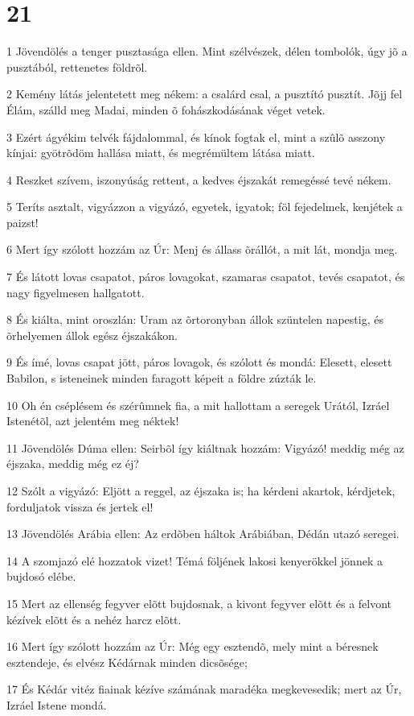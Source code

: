 \chapter{21}

\par 1 Jövendölés a tenger pusztasága ellen. Mint szélvészek, délen tombolók, úgy jõ a pusztából, rettenetes földrõl.
\par 2 Kemény látás jelentetett meg nékem: a csalárd csal, a pusztító pusztít. Jõjj fel Élám, szálld meg Madai, minden õ fohászkodásának véget vetek.
\par 3 Ezért ágyékim telvék fájdalommal, és kínok fogtak el, mint a szûlõ asszony kínjai: gyötrõdöm hallása miatt, és megrémültem látása miatt.
\par 4 Reszket szívem, iszonyúság rettent, a kedves éjszakát remegéssé tevé nékem.
\par 5 Teríts asztalt, vigyázzon a vigyázó, egyetek, igyatok; föl fejedelmek, kenjétek a paizst!
\par 6 Mert így szólott hozzám az Úr: Menj és állass õrállót, a mit lát, mondja meg.
\par 7 És látott lovas csapatot, páros lovagokat, szamaras csapatot, tevés csapatot, és nagy figyelmesen hallgatott.
\par 8 És kiálta, mint oroszlán: Uram az õrtoronyban állok szüntelen napestig, és õrhelyemen állok egész éjszakákon.
\par 9 És ímé, lovas csapat jött, páros lovagok, és szólott és mondá: Elesett, elesett Babilon, s isteneinek minden faragott képeit a földre zúzták le.
\par 10 Oh én cséplésem és szérûmnek fia, a mit hallottam a seregek Urától, Izráel Istenétõl, azt jelentém meg néktek!
\par 11 Jövendölés Dúma ellen: Seirbõl így kiáltnak hozzám: Vigyázó! meddig még az éjszaka, meddig még ez éj?
\par 12 Szólt a vigyázó: Eljött a reggel, az éjszaka is; ha kérdeni akartok, kérdjetek, forduljatok vissza és jertek el!
\par 13 Jövendölés Arábia ellen: Az erdõben háltok Arábiában, Dédán utazó seregei.
\par 14 A szomjazó elé hozzatok vizet! Témá följének lakosi kenyerökkel jönnek a bujdosó elébe.
\par 15 Mert az ellenség fegyver elõtt bujdosnak, a kivont fegyver elõtt és a felvont kézívek elõtt és a nehéz harcz elõtt.
\par 16 Mert így szólott hozzám az Úr: Még egy esztendõ, mely mint a béresnek esztendeje, és elvész Kédárnak minden dicsõsége;
\par 17 És Kédár vitéz fiainak kézíve számának maradéka megkevesedik; mert az Úr, Izráel Istene mondá.

